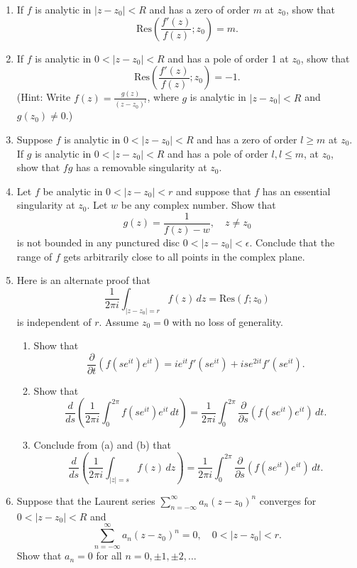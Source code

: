 \documentclass[12pt]{article}
\theoremstyle{definition} %
\theoremstyle{plain} %
\begin{document}
\noindent
\begin{enumerate}
    \item If $f$ is analytic in $|z - z_0| < R$ and has a zero of order $m$ at $z_0$, show that
\[
\text{Res}\left( \frac{f'(z)}{f(z)}; z_0 \right) = m.
\]

\item If $f$ is analytic in $0 < |z - z_0| < R$ and has a pole of order 1 at $z_0$, show that
\[
\text{Res}\left( \frac{f'(z)}{f(z)}; z_0 \right) = -1.
\]
(Hint: Write $f(z) = \frac{g(z)}{(z - z_0)^l}$, where $g$ is analytic in $|z - z_0| < R$ and $g(z_0) \ne 0$.)

\item Suppose $f$ is analytic in $0 < |z - z_0| < R$ and has a zero of order $l \ge m$ at $z_0$. If $g$ is analytic in $0 < |z - z_0| < R$ and has a pole of order $l, l \le m$, at $z_0$, show that $fg$ has a removable singularity at $z_0$.

\item Let $f$ be analytic in $0 < |z - z_0| < r$ and suppose that $f$ has an essential singularity at $z_0$. Let $w$ be any complex number. Show that
\[
g(z) = \frac{1}{f(z) - w}, \quad z \ne z_0
\]
is not bounded in any punctured disc $0 < |z - z_0| < \epsilon$. Conclude that the range of $f$ gets arbitrarily close to all points in the complex plane.

\item Here is an alternate proof that
\[
\frac{1}{2\pi i} \int_{|z - z_0| = r} f(z) \, dz = \text{Res}(f; z_0)
\]
is independent of $r$. Assume $z_0 = 0$ with no loss of generality.
\begin{enumerate}
    \item Show that
    \[
    \frac{\partial}{\partial t} (f(se^{it})e^{it}) = ie^{it} f'(se^{it}) + is e^{2it} f'(se^{it}).
    \]
    \item Show that
    \[
    \frac{d}{ds} \left( \frac{1}{2\pi i} \int_0^{2\pi} f(se^{it}) e^{it} \, dt \right) = \frac{1}{2\pi i} \int_0^{2\pi} \frac{\partial}{\partial s} (f(se^{it}) e^{it}) \, dt.
    \]
    \item Conclude from (a) and (b) that
    \[
    \frac{d}{ds} \left( \frac{1}{2\pi i} \int_{|z| = s} f(z) \, dz \right) = \frac{1}{2\pi i} \int_0^{2\pi} \frac{\partial}{\partial s} (f(se^{it}) e^{it}) \, dt.
    \]
\end{enumerate}

\item Suppose that the Laurent series $\sum_{n=-\infty}^{\infty} a_n (z - z_0)^n$ converges for $0 < |z - z_0| < R$ and
\[
\sum_{n=-\infty}^{\infty} a_n (z - z_0)^n = 0, \quad 0 < |z - z_0| < r.
\]
Show that $a_n = 0$ for all $n = 0, \pm1, \pm2, \ldots$


\end{enumerate}
\end{document}
